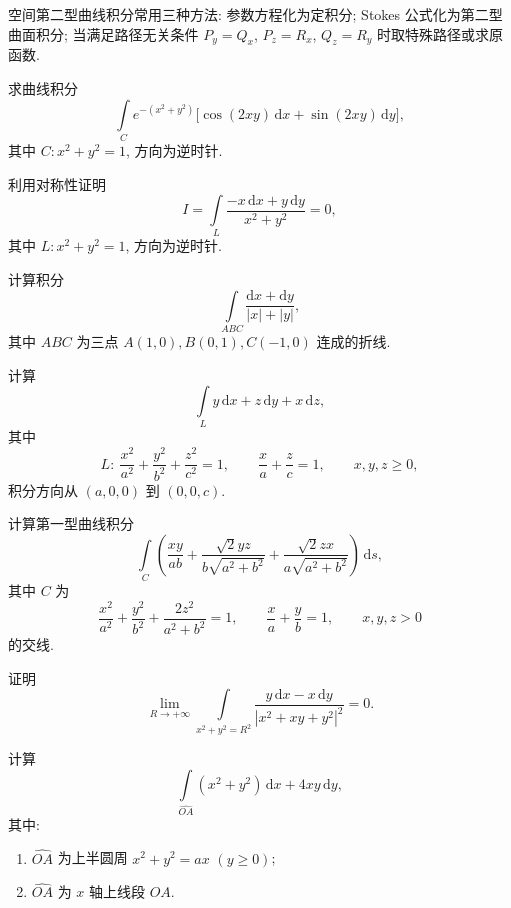 \documentclass[../数学分析培优讲义.tex]{subfiles}
\begin{document}
空间第二型曲线积分常用三种方法: 参数方程化为定积分; Stokes 公式化为第二型曲面积分; 当满足路径无关条件 $P_y=Q_x$, $P_z=R_x$, $Q_z=R_y$ 时取特殊路径或求原函数.

\begin{example}
求曲线积分
\[
    \int\limits_C e^{-(x^2+y^2)}\bigl\lbrack \cos(2xy)\,\mathrm{d}x+\sin(2xy)\,\mathrm{d}y\bigr\rbrack,
\]
其中 $C:x^2+y^2=1$, 方向为逆时针.
\end{example}
\exampleblank

\begin{example}
利用对称性证明
\[
    I=\int\limits_L\dfrac{-x\,\mathrm{d}x+y\,\mathrm{d}y}{x^2+y^2}=0,
\]
其中 $L:x^2+y^2=1$, 方向为逆时针.
\end{example}
\exampleblank

\begin{example}
计算积分
\[
    \int\limits_{ABC}\dfrac{\mathrm{d}x+\mathrm{d}y}{|x|+|y|},
\]
其中 $ABC$ 为三点 $A(1,0),B(0,1),C(-1,0)$ 连成的折线.
\end{example}
\exampleblank

\begin{example}
计算
\[
    \int\limits_L y\,\mathrm{d}x+z\,\mathrm{d}y+x\,\mathrm{d}z,
\]
其中
\[
    L:\ \dfrac{x^2}{a^2}+\dfrac{y^2}{b^2}+\dfrac{z^2}{c^2}=1,
    \qquad \dfrac{x}{a}+\dfrac{z}{c}=1,
    \qquad x,y,z\geq0,
\]
积分方向从 $(a,0,0)$ 到 $(0,0,c)$.
\end{example}
\exampleblank

\begin{example}
计算第一型曲线积分
\[
    \int\limits_C\left(
    \dfrac{xy}{ab}+\dfrac{\sqrt{2}yz}{b\sqrt{a^2+b^2}}+
    \dfrac{\sqrt{2}zx}{a\sqrt{a^2+b^2}}
    \right)\,\mathrm{d}s,
\]
其中 $C$ 为
\[
    \dfrac{x^2}{a^2}+\dfrac{y^2}{b^2}+\dfrac{2z^2}{a^2+b^2}=1,
    \qquad \dfrac{x}{a}+\dfrac{y}{b}=1,
    \qquad x,y,z>0
\]
的交线.
\end{example}
\exampleblank

\begin{example}
证明
\[
    \lim\limits_{R\to+\infty}
    \int\limits_{x^2+y^2=R^2}
    \dfrac{y\,\mathrm{d}x-x\,\mathrm{d}y}{|x^2+xy+y^2|^2}=0.
\]
\end{example}
\exampleblank

\begin{example}
计算
\[
    \int\limits_{\widehat{OA}}(x^2+y^2)\,\mathrm{d}x+4xy\,\mathrm{d}y,
\]
其中:
\begin{enumerate}[label=(\arabic*)]
    \item $\widehat{OA}$ 为上半圆周 $x^2+y^2=ax$ $(y\geq0)$;
    \item $\widehat{OA}$ 为 $x$ 轴上线段 $OA$.
\end{enumerate}
\end{example}
\exampleblank
\end{document}
